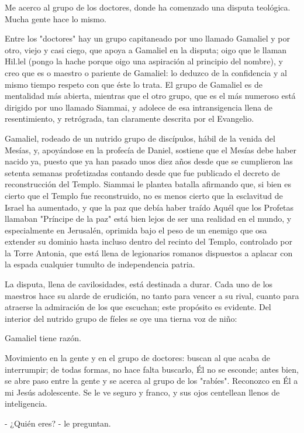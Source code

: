 \documentclass[12pt, twoside, openright]{book} %
\begin{document}
Me acerco al grupo de los doctores, donde ha comenzado una disputa teológica. Mucha gente hace lo mismo. 

Entre los "doctores" hay un grupo capitaneado por uno llamado Gamaliel y por otro, viejo y casi ciego, que apoya a Gamaliel en la disputa; oigo que le llaman Hil.lel (pongo la hache porque oigo una aspiración al principio del nombre), y creo que es o maestro o pariente de Gamaliel: lo deduzco de la confidencia y al mismo tiempo respeto con que éste lo trata. El grupo de Gamaliel es de mentalidad más abierta, mientras que el otro grupo, que es el más numeroso está dirigido por uno llamado Siammai, y adolece de esa intransigencia llena de resentimiento, y retrógrada, tan claramente descrita por el Evangelio. 

Gamaliel, rodeado de un nutrido grupo de discípulos, hábil de la venida del Mesías, y, apoyándose en la profecía de Daniel, sostiene que el Mesías debe haber nacido ya, puesto que ya han pasado unos diez años desde que se cumplieron las setenta semanas profetizadas contando desde que fue publicado el decreto de reconstrucción del Templo. Siammai le plantea batalla afirmando que, si bien es cierto que el Templo fue reconstruido, no es menos cierto que la esclavitud de Israel ha aumentado, y que la paz que debía haber traído Aquél que los Profetas llamaban "Príncipe de la paz" está bien lejos de ser una realidad en el mundo, y especialmente en Jerusalén, oprimida bajo el peso de un enemigo que osa extender su dominio hasta incluso dentro del recinto del Templo, controlado por la Torre Antonia, que está llena de legionarios romanos dispuestos a aplacar con la espada cualquier tumulto de independencia patria. 

La disputa, llena de cavilosidades, está destinada a durar. Cada uno de los maestros hace su alarde de erudición, no tanto para vencer a su rival, cuanto para atraerse la admiración de los que escuchan; este propósito es evidente. Del interior del nutrido grupo de fíeles se oye una tierna voz de niño: 

Gamaliel tiene razón. 

Movimiento en la gente y en el grupo de doctores: buscan al que acaba de interrumpir; de todas formas, no hace falta buscarlo, Él no se esconde; antes bien, se abre paso entre la gente y se acerca al grupo de los "rabíes". Reconozco en Él a mi Jesús adolescente. Se le ve seguro y franco, y sus ojos centellean llenos de inteligencia. 

- ¿Quién eres? - le preguntan. 
\end{document}
